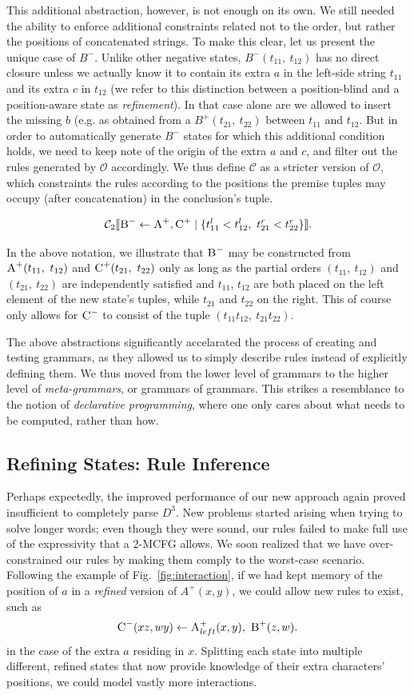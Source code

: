 \documentclass[nonatbib,numbers,10pt]{sigplanconf}
\newcommand\s{\textsc}
\newcommand{\Order}[5]{
	\[
	\mathcal{#1}_{#5}\llbracket #2 \leftarrow #3 \mid \{ #4 \} \rrbracket.
	\]
}
\newcommand{\Con}[4]{\Order{C}{#1}{#2}{#3}{#4}}
\begin{document}
This additional abstraction, however, is not enough on its own. We still needed the ability to enforce additional constraints related not to the order, but rather the positions of concatenated strings. To make this clear, let us present the unique case of $B^{-}$. Unlike other negative states, $B^{-}(t_{11},\ t_{12})$ has no direct closure unless we actually know it to contain its extra $a$ in the left-side string $t_{11}$ and its extra $c$ in $t_{12}$ (we refer to this distinction between a position-blind and a position-aware state as \textit{refinement}). In that case alone are we allowed to insert the missing $b$ (e.g. as obtained from a $B^{+}(t_{21},\ t_{22})$ between $t_{11}$ and $t_{12}$. But in order to automatically generate $B^{-}$ states for which this additional condition holds, we need to keep note of the origin of the extra $a$ and $c$, and filter out the rules generated by $\mathcal{O}$ accordingly. We thus define $\mathcal{C}$ as a stricter version of $\mathcal{O}$, which constraints the rules according to the positions the premise tuples may occupy (after concatenation) in the conclusion's tuple.
\Con{\textsc{B}^-}{\textsc{A}^+, \textsc{C}^+}{t_{11}^l < t_{12}^l,\ t_{21}^r < t_{22}^r}{2}
In the above notation, we illustrate that $\textsc{B}^{-}$ may be constructed from $\textsc{A}^{+}(t_{11},\ t_{12})$ and $\textsc{C}^{+}(t_{21},\ t_{22})$ only as long as the partial orders $(t_{11},\ t_{12})$ and $(t_{21},\ t_{22})$ are independently satisfied and $t_{11}$, $t_{12}$ are both placed on the left element of the new state's tuples, while $t_{21}$ and $t_{22}$ on the right. This of course only allows for $\textsc{C}^{-}$ to consist of the tuple $(t_{11}t_{12},\ t_{21}t_{22})$.

The above abstractions significantly accelarated the process of creating and testing grammars, as they allowed us to simply describe rules instead of explicitly defining them. We thus moved from the lower level of grammars to the higher level of \textit{meta-grammars}, or grammars of grammars. This strikes a resemblance to the notion of \textit{declarative programming}, where one only cares about what needs to be computed, rather than how.

\subsection{Refining States: Rule Inference}\label{aris}	
Perhaps expectedly, the improved performance of our new approach again proved insufficient to completely parse $D^3$. New problems started arising when trying to solve longer words; even though they were sound, our rules failed to make full use of the expressivity that a 2-MCFG allows. We soon realized that we have over-constrained our rules by making them comply to the worst-case scenario. Following the example of Fig.~\ref{fig:interaction}, if we had kept memory of the position of $a$ in a \textit{refined} version of  $A^{+}(x,y)$, we could allow new rules to exist, such as \[\s{C}^-(xz,wy) \leftarrow \s{A}^+_{left}(x,y),\ \s{B}^+(z,w).\] in the case of the extra $a$ residing in $x$. Splitting each state into multiple different, refined states that now provide knowledge of their extra characters' positions, we could model vastly more interactions.
\end{document}
